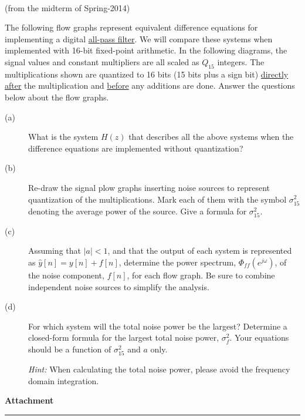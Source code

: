 \documentclass[12pt]{report}
\begin{document}
\mbox{}\\
 (from the midterm of Spring-2014)

The following flow graphs represent equivalent difference equations for implementing a digital \underline{all-pass filter}. We will compare these systems when implemented with 16-bit fixed-point arithmetic. In the following diagrams, the signal values and constant multipliers are all scaled as $Q_{15}$ integers. The multiplications shown are quantized to 16 bits (15 bits plus a sign bit) \underline{directly after} the multiplication and \underline{before} any additions are done. Answer the questions below about the flow graphs.

\begin{center}
	
\end{center}

\begin{description}
	\item[(a)] What is the system $H(z)$ that describes all the above systems when the difference equations are implemented without quantization?
	\item[(b)] Re-draw the signal plow graphs inserting noise sources to represent quantization of the multiplications. Mark each of them with the symbol $\sigma_{15}^2$ denoting the average power of the source. Give a formula for $\sigma_{15}^2$.
	\item[(c)] Assuming that $|a|<1$, and that the output of each system is represented as $\hat{y}[n] = y[n] + f[n]$, determine the power spectrum, $\Phi_{ff}(e^{j\omega})$, of the noise component, $f[n]$, for each flow graph. Be sure to combine independent noise sources to simplify the analysis.
	\item[(d)] For which system will the total noise power be the largest? Determine a closed-form formula for the largest total noise power, $\sigma_f^2$. Your equations should be a function of $\sigma_{15}^2$ and $a$ only.
	
\textit{Hint:} When calculating the total noise power, please avoid the frequency domain integration.
\end{description}

\newpage
\noindent \textbf{Attachment}\\
\rule{6.5 in}{0.5pt}
\end{document}
